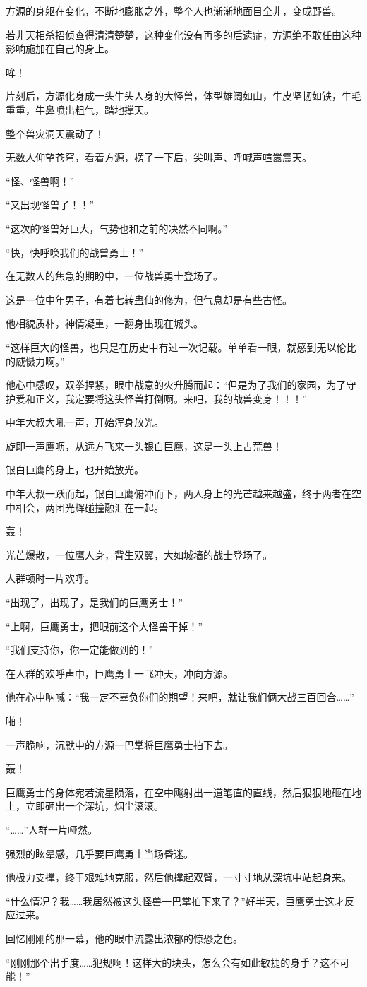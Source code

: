 \begin{this_body}
方源的身躯在变化，不断地膨胀之外，整个人也渐渐地面目全非，变成野兽。

若非天相杀招侦查得清清楚楚，这种变化没有再多的后遗症，方源绝不敢任由这种影响施加在自己的身上。

哞！

片刻后，方源化身成一头牛头人身的大怪兽，体型雄阔如山，牛皮坚韧如铁，牛毛重重，牛鼻喷出粗气，踏地撑天。

整个兽灾洞天震动了！

无数人仰望苍穹，看着方源，楞了一下后，尖叫声、呼喊声喧嚣震天。

“怪、怪兽啊！”

“又出现怪兽了！！”

“这次的怪兽好巨大，气势也和之前的决然不同啊。”

“快，快呼唤我们的战兽勇士！”

在无数人的焦急的期盼中，一位战兽勇士登场了。

这是一位中年男子，有着七转蛊仙的修为，但气息却是有些古怪。

他相貌质朴，神情凝重，一翻身出现在城头。

“这样巨大的怪兽，也只是在历史中有过一次记载。单单看一眼，就感到无以伦比的威慑力啊。”

他心中感叹，双拳捏紧，眼中战意的火升腾而起：“但是为了我们的家园，为了守护爱和正义，我定要将这头怪兽打倒啊。来吧，我的战兽变身！！！”

中年大叔大吼一声，开始浑身放光。

旋即一声鹰呖，从远方飞来一头银白巨鹰，这是一头上古荒兽！

银白巨鹰的身上，也开始放光。

中年大叔一跃而起，银白巨鹰俯冲而下，两人身上的光芒越来越盛，终于两者在空中相会，两团光辉碰撞融汇在一起。

轰！

光芒爆散，一位鹰人身，背生双翼，大如城墙的战士登场了。

人群顿时一片欢呼。

“出现了，出现了，是我们的巨鹰勇士！”

“上啊，巨鹰勇士，把眼前这个大怪兽干掉！”

“我们支持你，你一定能做到的！”

在人群的欢呼声中，巨鹰勇士一飞冲天，冲向方源。

他在心中呐喊：“我一定不辜负你们的期望！来吧，就让我们俩大战三百回合……”

啪！

一声脆响，沉默中的方源一巴掌将巨鹰勇士拍下去。

轰！

巨鹰勇士的身体宛若流星陨落，在空中飚射出一道笔直的直线，然后狠狠地砸在地上，立即砸出一个深坑，烟尘滚滚。

“……”人群一片哑然。

强烈的眩晕感，几乎要巨鹰勇士当场昏迷。

他极力支撑，终于艰难地克服，然后他撑起双臂，一寸寸地从深坑中站起身来。

“什么情况？我……我居然被这头怪兽一巴掌拍下来了？”好半天，巨鹰勇士这才反应过来。

回忆刚刚的那一幕，他的眼中流露出浓郁的惊恐之色。

“刚刚那个出手度……犯规啊！这样大的块头，怎么会有如此敏捷的身手？这不可能！”

\end{this_body}

